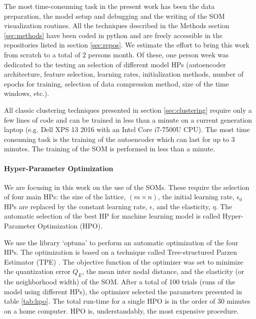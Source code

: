 The most time-consuming task in the present work has been the data preparation, the model setup and debugging and the writing of the SOM visualization routines. All the techniques described in the Methods section \ref{sec:methods} have been coded in python and are freely accessible in the repositories listed in section \ref{sec:repos}. We estimate the effort to bring this work from scratch to a total of 2 persons month. Of these, one person week was dedicated to the testing an selection of different model HPs (autoencoder architecture, feature selection, learning rates, initialization methods, number of epochs for training, selection of data compression method, size of the time windows, etc.).

All classic clustering techniques presented in section \ref{sec:clustering} require only a few lines of code and can be trained in less than a minute on a current generation laptop (e.g. Dell XPS 13 2016 with an Intel Core i7-7500U CPU). The most time consuming task is the training of the autoencoder which can last for up to 3 minutes. The training of the SOM is performed in less than a minute.

\paragraph{Hyper-Parameter Optimization}
We are focusing in this work on the use of the SOMs. These require the selection of four main HPs: the size of the lattice, $(m\times n)$, the initial learning rate, $\epsilon_0$HPs are replaced by the constant learning rate, $\epsilon$, and the elasticity, $\eta$. The automatic selection of the best HP for machine learning model is called Hyper-Parameter Optimization (HPO).

We use the library `optuna' \citep{[REF??]} to perform an automatic optimization of the four HPs. The optimization is based on a technique called Tree-structured Parzen Estimator (TPE) \citep{[REF 3 IN OPTUNA PAPER??]}. The objective function of the optimizer was set to minimize the quantization error $Q_E$, the mean inter nodal distance, and the elasticity (or the neighborhood width) of the SOM. After a total of 100 trials (runs of the model using different HPs), the optimizer selected the parameters presented in table \ref{tab:hpo}. The total run-time for a single HPO is in the order of 30 minutes on a home computer. HPO is, understandably, the most expensive procedure.
